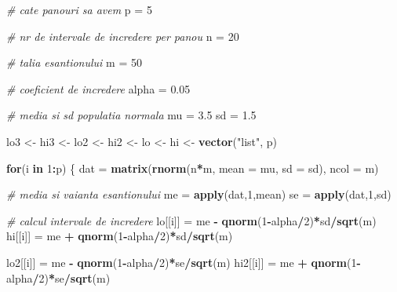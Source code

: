 \documentclass[]{article}
\newenvironment{Shaded}{\begin{snugshade}}{\end{snugshade}}
\newcommand{\KeywordTok}[1]{\textcolor[rgb]{0.13,0.29,0.53}{\textbf{#1}}}
\newcommand{\DataTypeTok}[1]{\textcolor[rgb]{0.13,0.29,0.53}{#1}}
\newcommand{\DecValTok}[1]{\textcolor[rgb]{0.00,0.00,0.81}{#1}}
\newcommand{\FloatTok}[1]{\textcolor[rgb]{0.00,0.00,0.81}{#1}}
\newcommand{\StringTok}[1]{\textcolor[rgb]{0.31,0.60,0.02}{#1}}
\newcommand{\CommentTok}[1]{\textcolor[rgb]{0.56,0.35,0.01}{\textit{#1}}}
\newcommand{\ControlFlowTok}[1]{\textcolor[rgb]{0.13,0.29,0.53}{\textbf{#1}}}
\newcommand{\OperatorTok}[1]{\textcolor[rgb]{0.81,0.36,0.00}{\textbf{#1}}}
\newcommand{\NormalTok}[1]{#1}
\begin{document}
\begin{Shaded}
\begin{Highlighting}[]
\CommentTok{# cate panouri sa avem }
\NormalTok{p =}\StringTok{ }\DecValTok{5}

\CommentTok{# nr de intervale de incredere per panou}
\NormalTok{n =}\StringTok{ }\DecValTok{20}

\CommentTok{# talia esantionului}
\NormalTok{m =}\StringTok{ }\DecValTok{50} 

\CommentTok{# coeficient de incredere}
\NormalTok{alpha =}\StringTok{ }\FloatTok{0.05} 

\CommentTok{# media si sd populatia normala}
\NormalTok{mu =}\StringTok{ }\FloatTok{3.5}
\NormalTok{sd =}\StringTok{ }\FloatTok{1.5}

\NormalTok{lo3 <-}\StringTok{ }\NormalTok{hi3 <-}\StringTok{ }\NormalTok{lo2 <-}\StringTok{ }\NormalTok{hi2 <-}\StringTok{ }\NormalTok{lo <-}\StringTok{ }\NormalTok{hi <-}\StringTok{ }\KeywordTok{vector}\NormalTok{(}\StringTok{"list"}\NormalTok{, p)}

\ControlFlowTok{for}\NormalTok{(i }\ControlFlowTok{in} \DecValTok{1}\OperatorTok{:}\NormalTok{p) \{}
\NormalTok{  dat =}\StringTok{ }\KeywordTok{matrix}\NormalTok{(}\KeywordTok{rnorm}\NormalTok{(n}\OperatorTok{*}\NormalTok{m, }\DataTypeTok{mean =}\NormalTok{ mu, }\DataTypeTok{sd =}\NormalTok{ sd), }\DataTypeTok{ncol =}\NormalTok{ m)}
  
  \CommentTok{# media si vaianta esantionului }
\NormalTok{  me =}\StringTok{ }\KeywordTok{apply}\NormalTok{(dat,}\DecValTok{1}\NormalTok{,mean)}
\NormalTok{  se =}\StringTok{ }\KeywordTok{apply}\NormalTok{(dat,}\DecValTok{1}\NormalTok{,sd)}
  
  \CommentTok{# calcul intervale de incredere}
\NormalTok{  lo[[i]] =}\StringTok{ }\NormalTok{me }\OperatorTok{-}\StringTok{ }\KeywordTok{qnorm}\NormalTok{(}\DecValTok{1}\OperatorTok{-}\NormalTok{alpha}\OperatorTok{/}\DecValTok{2}\NormalTok{)}\OperatorTok{*}\NormalTok{sd}\OperatorTok{/}\KeywordTok{sqrt}\NormalTok{(m)}
\NormalTok{  hi[[i]] =}\StringTok{ }\NormalTok{me }\OperatorTok{+}\StringTok{ }\KeywordTok{qnorm}\NormalTok{(}\DecValTok{1}\OperatorTok{-}\NormalTok{alpha}\OperatorTok{/}\DecValTok{2}\NormalTok{)}\OperatorTok{*}\NormalTok{sd}\OperatorTok{/}\KeywordTok{sqrt}\NormalTok{(m)}
  
\NormalTok{  lo2[[i]] =}\StringTok{ }\NormalTok{me }\OperatorTok{-}\StringTok{ }\KeywordTok{qnorm}\NormalTok{(}\DecValTok{1}\OperatorTok{-}\NormalTok{alpha}\OperatorTok{/}\DecValTok{2}\NormalTok{)}\OperatorTok{*}\NormalTok{se}\OperatorTok{/}\KeywordTok{sqrt}\NormalTok{(m)}
\NormalTok{  hi2[[i]] =}\StringTok{ }\NormalTok{me }\OperatorTok{+}\StringTok{ }\KeywordTok{qnorm}\NormalTok{(}\DecValTok{1}\OperatorTok{-}\NormalTok{alpha}\OperatorTok{/}\DecValTok{2}\NormalTok{)}\OperatorTok{*}\NormalTok{se}\OperatorTok{/}\KeywordTok{sqrt}\NormalTok{(m)}
  

\end{Highlighting}
\end{Shaded}
\end{document}
